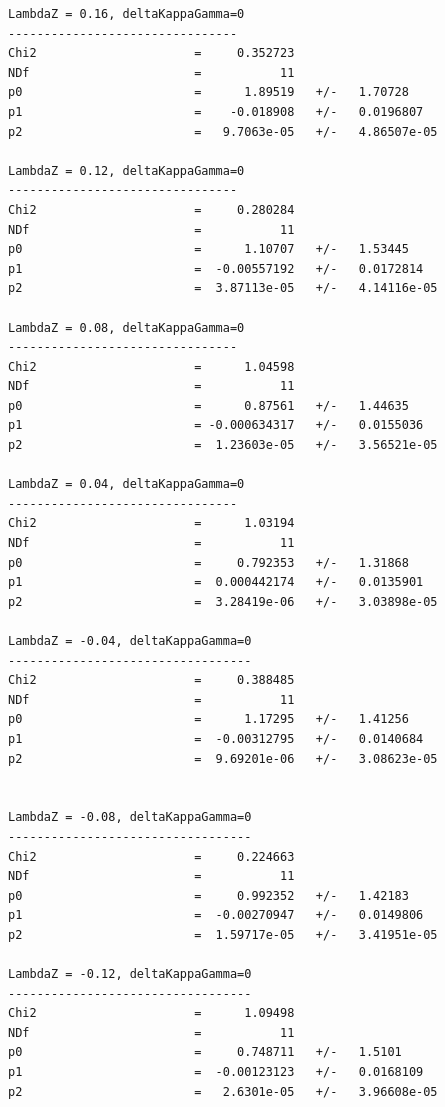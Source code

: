 \begin{verbatim}
LambdaZ = 0.16, deltaKappaGamma=0
--------------------------------
Chi2                      =     0.352723
NDf                       =           11
p0                        =      1.89519   +/-   1.70728     
p1                        =    -0.018908   +/-   0.0196807   
p2                        =   9.7063e-05   +/-   4.86507e-05 

LambdaZ = 0.12, deltaKappaGamma=0
--------------------------------
Chi2                      =     0.280284
NDf                       =           11
p0                        =      1.10707   +/-   1.53445     
p1                        =  -0.00557192   +/-   0.0172814   
p2                        =  3.87113e-05   +/-   4.14116e-05 

LambdaZ = 0.08, deltaKappaGamma=0
--------------------------------
Chi2                      =      1.04598
NDf                       =           11
p0                        =      0.87561   +/-   1.44635     
p1                        = -0.000634317   +/-   0.0155036   
p2                        =  1.23603e-05   +/-   3.56521e-05 

LambdaZ = 0.04, deltaKappaGamma=0
--------------------------------
Chi2                      =      1.03194
NDf                       =           11
p0                        =     0.792353   +/-   1.31868     
p1                        =  0.000442174   +/-   0.0135901   
p2                        =  3.28419e-06   +/-   3.03898e-05 

LambdaZ = -0.04, deltaKappaGamma=0
----------------------------------
Chi2                      =     0.388485
NDf                       =           11
p0                        =      1.17295   +/-   1.41256     
p1                        =  -0.00312795   +/-   0.0140684   
p2                        =  9.69201e-06   +/-   3.08623e-05 


LambdaZ = -0.08, deltaKappaGamma=0
----------------------------------
Chi2                      =     0.224663
NDf                       =           11
p0                        =     0.992352   +/-   1.42183     
p1                        =  -0.00270947   +/-   0.0149806   
p2                        =  1.59717e-05   +/-   3.41951e-05 

LambdaZ = -0.12, deltaKappaGamma=0
----------------------------------
Chi2                      =      1.09498
NDf                       =           11
p0                        =     0.748711   +/-   1.5101      
p1                        =  -0.00123123   +/-   0.0168109   
p2                        =   2.6301e-05   +/-   3.96608e-05 


\end{verbatim}
